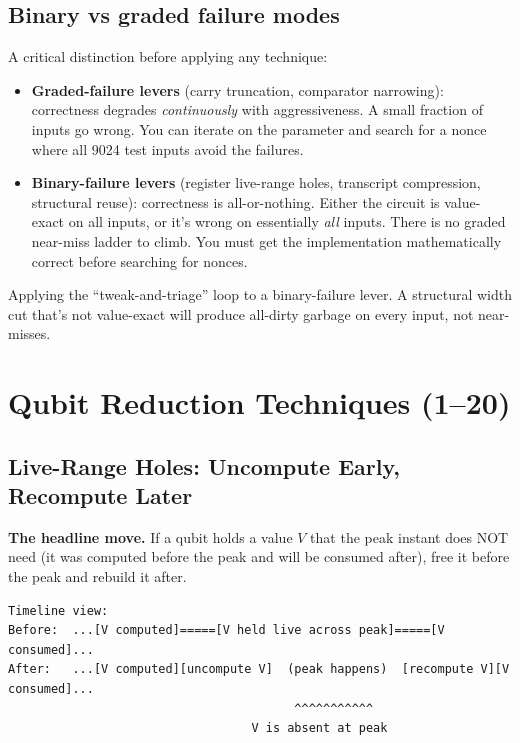 \documentclass[11pt,a4paper]{article}
\begin{document}
\subsection{Binary vs graded failure modes}

A critical distinction before applying any technique:

\begin{itemize}
  \item \textbf{Graded-failure levers} (carry truncation, comparator narrowing): correctness
    degrades \emph{continuously} with aggressiveness. A small fraction of inputs go wrong. You can
    iterate on the parameter and search for a nonce where all 9024 test inputs avoid the failures.

  \item \textbf{Binary-failure levers} (register live-range holes, transcript compression,
    structural reuse): correctness is all-or-nothing. Either the circuit is value-exact on all
    inputs, or it's wrong on essentially \emph{all} inputs. There is no graded near-miss ladder
    to climb. You must get the implementation mathematically correct before searching for nonces.
\end{itemize}

\begin{tcolorbox}[noteboxstyle, title=The trap]
Applying the ``tweak-and-triage'' loop to a binary-failure lever.
A structural width cut that's not value-exact will produce all-dirty garbage on every input, not
near-misses.
\end{tcolorbox}

\section{Qubit Reduction Techniques (1--20)}
\label{sec:qubittech}

\subsection{Live-Range Holes: Uncompute Early, Recompute Later}
\label{sec:liverange}

\textbf{The headline move.} If a qubit holds a value $V$ that the peak instant does NOT need (it
was computed before the peak and will be consumed after), free it before the peak and rebuild it
after.

\begin{lstlisting}
Timeline view:
Before:  ...[V computed]=====[V held live across peak]=====[V consumed]...
After:   ...[V computed][uncompute V]  (peak happens)  [recompute V][V consumed]...
                                        ^^^^^^^^^^^
                                  V is absent at peak
\end{lstlisting}
\end{document}
